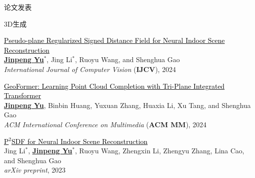 \documentclass{resume} %
\newcommand{\publink}[2]{\href{#1}{\textcolor{black}{#2}}}
\begin{document}
\begin{rSection}{论文发表}
\begin{rSubsection}{\hspace*{-1.5em}3D生成}{}{}{}
\item \publink{https://jinpeng-yu.github.io/documents/PPlaneSDF.pdf}{Pseudo-plane Regularized Signed Distance Field for Neural Indoor Scene Reconstruction} \\
\underline{\bf Jinpeng Yu$^*$}, Jing Li$^*$, Ruoyu Wang, and Shenghua Gao \\
{\em International Journal of Computer Vision} ({\bf IJCV}), 2024
\item \publink{https://arxiv.org/abs/2408.06596}{GeoFormer: Learning Point Cloud Completion with Tri-Plane Integrated Transformer} \\
\underline{\bf Jinpeng Yu}, Binbin Huang, Yuxuan Zhang, Huaxia Li, Xu Tang, and Shenghua Gao \\
{\em ACM International Conference on Multimedia} ({\bf ACM MM}), 2024
\item \publink{https://arxiv.org/abs/2303.00236}{P$^2$SDF for Neural Indoor Scene Reconstruction} \\
Jing Li$^*$, \underline{\bf Jinpeng Yu$^*$}, Ruoyu Wang, Zhengxin Li, Zhengyu Zhang, Lina Cao, and Shenghua Gao \\
{\em arXiv preprint}, 2023
\end{rSubsection}
\end{rSection}






% 


% 
\end{document}
